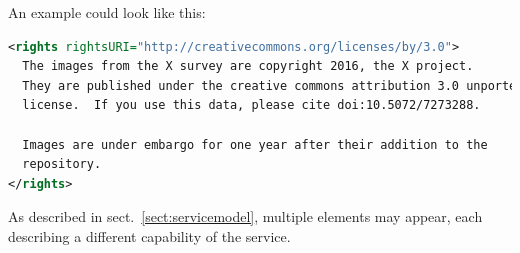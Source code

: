 \documentclass[11pt,a4paper]{ivoa}
\begin{document}

An example could look like this:

\begin{lstlisting}[language=XML,basicstyle=\footnotesize]
<rights rightsURI="http://creativecommons.org/licenses/by/3.0">
  The images from the X survey are copyright 2016, the X project.
  They are published under the creative commons attribution 3.0 unported
  license.  If you use this data, please cite doi:10.5072/7273288.

  Images are under embargo for one year after their addition to the
  repository.
</rights>
\end{lstlisting}

As described in sect.~\ref{sect:servicemodel}, multiple
 elements may appear, each describing a
different capability of the service.  
\end{document}
